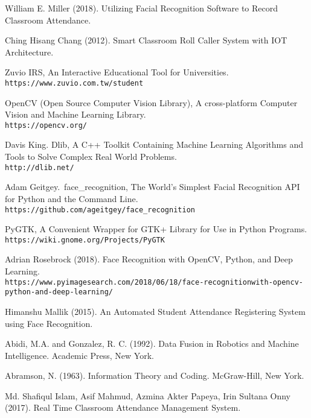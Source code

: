 \begin{thebibliography}{10}

  William E. Miller (2018).
  Utilizing Facial Recognition Software to Record Classroom Attendance.

  Ching Hisang Chang (2012).
  Smart Classroom Roll Caller System with IOT Architecture.

  Zuvio IRS,
  An Interactive Educational Tool for Universities.
  \\\texttt{https://www.zuvio.com.tw/student}

  OpenCV (Open Source Computer Vision Library),
  A cross-platform Computer Vision and Machine Learning Library.
  \\\texttt{https://opencv.org/}

  Davis King.
  Dlib,
  A C++ Toolkit Containing Machine Learning Algorithms and Tools to Solve Complex Real World Problems.
  \\\texttt{http://dlib.net/}

  Adam Geitgey.\
  face\_recognition,
  The World's Simplest Facial Recognition API for Python and the Command Line.
  \\\texttt{https://github.com/ageitgey/face\_recognition}

  PyGTK,
  A Convenient Wrapper for GTK+ Library for Use in Python Programs.
  \\\texttt{https://wiki.gnome.org/Projects/PyGTK}

  Adrian Rosebrock (2018).
  Face Recognition with OpenCV, Python, and Deep Learning.
  \\\texttt{https://www.pyimagesearch.com/2018/06/18/face-recognition\-with-opencv-python-and-deep-learning/}

  Himanshu Mallik (2015).
  An Automated Student Attendance Registering System using Face Recognition.

  Abidi, M.A. and Gonzalez, R. C. (1992).
  Data Fusion in Robotics and Machine Intelligence.
  Academic Press, New York.

  Abramson, N. (1963).
  Information Theory and Coding.
  McGraw-Hill, New York.

  Md. Shafiqul Islam, Asif Mahmud, Azmina Akter Papeya, Irin Sultana Onny (2017).
  Real Time Classroom Attendance Management System.

\end{thebibliography}
